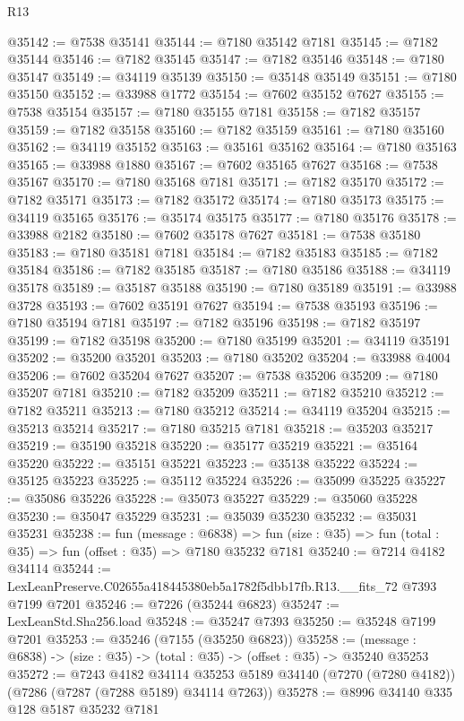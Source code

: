 \begin{lexlean}{R13}
\begin{coremodule}
@35142 := @7538 @35141
@35144 := @7180 @35142 @7181
@35145 := @7182 @35144
@35146 := @7182 @35145
@35147 := @7182 @35146
@35148 := @7180 @35147
@35149 := @34119 @35139
@35150 := @35148 @35149
@35151 := @7180 @35150
@35152 := @33988 @1772
@35154 := @7602 @35152 @7627
@35155 := @7538 @35154
@35157 := @7180 @35155 @7181
@35158 := @7182 @35157
@35159 := @7182 @35158
@35160 := @7182 @35159
@35161 := @7180 @35160
@35162 := @34119 @35152
@35163 := @35161 @35162
@35164 := @7180 @35163
@35165 := @33988 @1880
@35167 := @7602 @35165 @7627
@35168 := @7538 @35167
@35170 := @7180 @35168 @7181
@35171 := @7182 @35170
@35172 := @7182 @35171
@35173 := @7182 @35172
@35174 := @7180 @35173
@35175 := @34119 @35165
@35176 := @35174 @35175
@35177 := @7180 @35176
@35178 := @33988 @2182
@35180 := @7602 @35178 @7627
@35181 := @7538 @35180
@35183 := @7180 @35181 @7181
@35184 := @7182 @35183
@35185 := @7182 @35184
@35186 := @7182 @35185
@35187 := @7180 @35186
@35188 := @34119 @35178
@35189 := @35187 @35188
@35190 := @7180 @35189
@35191 := @33988 @3728
@35193 := @7602 @35191 @7627
@35194 := @7538 @35193
@35196 := @7180 @35194 @7181
@35197 := @7182 @35196
@35198 := @7182 @35197
@35199 := @7182 @35198
@35200 := @7180 @35199
@35201 := @34119 @35191
@35202 := @35200 @35201
@35203 := @7180 @35202
@35204 := @33988 @4004
@35206 := @7602 @35204 @7627
@35207 := @7538 @35206
@35209 := @7180 @35207 @7181
@35210 := @7182 @35209
@35211 := @7182 @35210
@35212 := @7182 @35211
@35213 := @7180 @35212
@35214 := @34119 @35204
@35215 := @35213 @35214
@35217 := @7180 @35215 @7181
@35218 := @35203 @35217
@35219 := @35190 @35218
@35220 := @35177 @35219
@35221 := @35164 @35220
@35222 := @35151 @35221
@35223 := @35138 @35222
@35224 := @35125 @35223
@35225 := @35112 @35224
@35226 := @35099 @35225
@35227 := @35086 @35226
@35228 := @35073 @35227
@35229 := @35060 @35228
@35230 := @35047 @35229
@35231 := @35039 @35230
@35232 := @35031 @35231
@35238 := fun (message : @6838) =>
  fun (size : @35) => fun (total : @35) => fun (offset : @35) => @7180 @35232 @7181
@35240 := @7214 @4182 @34114
@35244 := LexLeanPreserve.C02655a418445380eb5a1782f5dbb17fb.R13.__fits_72 @7393 @7199 @7201
@35246 := @7226 (@35244 @6823)
@35247 := LexLeanStd.Sha256.load
@35248 := @35247 @7393
@35250 := @35248 @7199 @7201
@35253 := @35246 (@7155 (@35250 @6823))
@35258 := (message : @6838) -> (size : @35) -> (total : @35) -> (offset : @35) -> @35240 @35253
@35272 := @7243
    @4182
    @34114
    @35253
    @5189
    @34140
    (@7270 (@7280 @4182))
    (@7286 (@7287 (@7288 @5189) @34114 @7263))
@35278 := @8996 @34140 @335 @128 @5187 @35232 @7181

\end{coremodule}
\end{lexlean}
